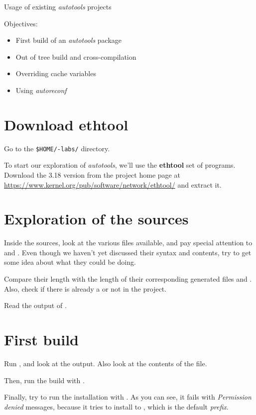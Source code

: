 \subchapter
{Usage of existing {\em autotools} projects}
{Objectives:
  \begin{itemize}
  \item First build of an {\em autotools} package
  \item Out of tree build and cross-compilation
  \item Overriding cache variables
  \item Using {\em autoreconf}
  \end{itemize}
}

\section{Download ethtool}

Go to the {\tt \$HOME/\longname-labs/} directory.

To start our exploration of {\em autotools}, we'll use the {\bf
  ethtool} set of programs. Download the 3.18 version from the project
home page at
\url{https://www.kernel.org/pub/software/network/ethtool/} and extract
it.

\section{Exploration of the sources}

Inside the sources, look at the various files available, and pay
special attention to  and . Even
though we haven't yet discussed their syntax and contents, try to get
some idea about what they could be doing.

Compare their length with the length of their corresponding generated
files  and . Also, check if there is
already a  or not in the project.

Read the output of .

\section{First build}

Run , and look at the output. Also look at the
contents of the  file.

Then, run the build with .

Finally, try to run the installation with . As you
can see, it fails with {\em Permission denied} messages, because it
tries to install to , which is the default {\em
  prefix}.

